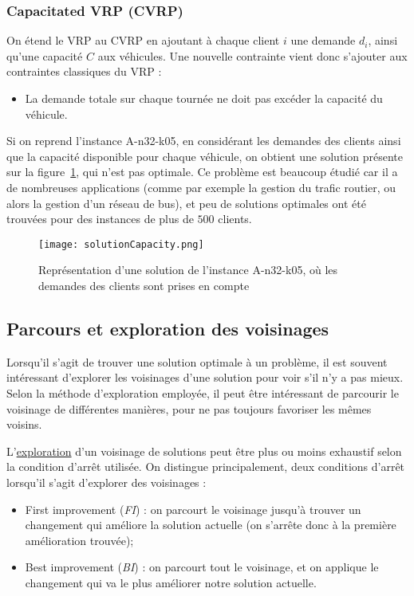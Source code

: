 \documentclass[a4paper,11pt]{article}%
\begin{document}
\subsubsection{Capacitated VRP (CVRP)}

On étend le VRP au CVRP en ajoutant à chaque client $i$ une demande $d_i$, ainsi qu'une capacité $C$ aux véhicules.
Une nouvelle contrainte vient donc s'ajouter aux contraintes classiques du VRP :
\begin{itemize}
\item La demande totale sur chaque tournée ne doit pas excéder la capacité du véhicule.
\end{itemize}
Si on reprend l'instance A-n32-k05, en considérant les demandes des clients ainsi que la capacité disponible pour chaque véhicule, on obtient une solution présente sur la figure~\ref{SC3205}, qui n'est pas optimale. 
Ce problème est beaucoup étudié car il a de nombreuses applications (comme par exemple la gestion du trafic routier, ou alors la gestion d'un réseau de bus), et peu de solutions optimales ont été trouvées pour des instances de plus de $500$ clients. 

\begin{figure}
\centering
\texttt{[image: solutionCapacity.png]}
\caption{Représentation d'une solution de l'instance A-n32-k05, où les demandes des clients sont prises en compte}
\label{SC3205}
\end{figure}

\subsection{Parcours et exploration des voisinages}
\label{voisinage}

Lorsqu'il s'agit de trouver une solution optimale à un problème, il est souvent intéressant d'explorer les voisinages d'une solution pour voir s'il n'y a pas mieux. Selon la méthode d'exploration employée, il peut être intéressant de parcourir le voisinage de différentes manières, pour ne pas toujours favoriser les mêmes voisins.

L'\underline{exploration} d'un voisinage de solutions peut être plus ou moins exhaustif selon la condition d'arrêt utilisée.
On distingue principalement, deux conditions d'arrêt lorsqu'il s'agit d'explorer des voisinages :

\begin{itemize}
\item First improvement (\emph{FI}) : on parcourt le voisinage jusqu'à trouver un changement qui améliore la solution actuelle (on s'arrête donc à la première amélioration trouvée);
\item Best improvement (\emph{BI}) : on parcourt tout le voisinage, et on applique le changement qui va le plus améliorer notre solution actuelle. \\
\end{itemize}
\end{document}
